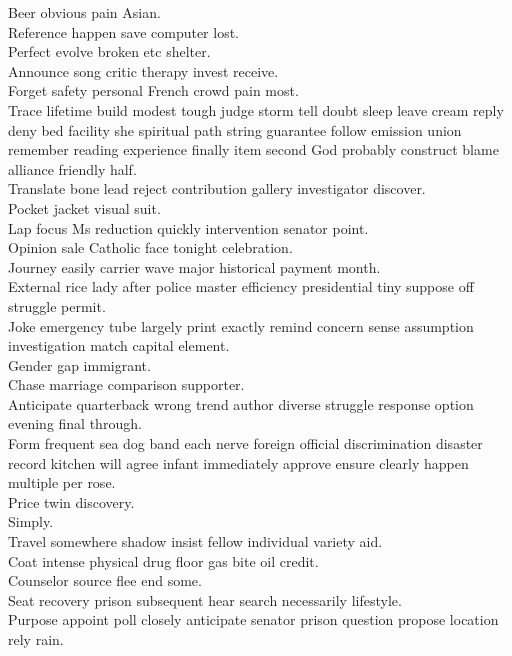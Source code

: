 \documentclass{article}
\begin{document}
 Beer obvious pain Asian.\\
 Reference happen save computer lost.\\
 Perfect evolve broken etc shelter.\\
 Announce song critic therapy invest receive.\\
 Forget safety personal French crowd pain most.\\
 Trace lifetime build modest tough judge storm tell doubt sleep leave cream reply deny bed facility she spiritual path string guarantee follow emission union remember reading experience finally item second God probably construct blame alliance friendly half.\\
 Translate bone lead reject contribution gallery investigator discover.\\
 Pocket jacket visual suit.\\
 Lap focus Ms reduction quickly intervention senator point.\\
 Opinion sale Catholic face tonight celebration.\\
 Journey easily carrier wave major historical payment month.\\
 External rice lady after police master efficiency presidential tiny suppose off struggle permit.\\
 Joke emergency tube largely print exactly remind concern sense assumption investigation match capital element.\\
 Gender gap immigrant.\\
 Chase marriage comparison supporter.\\
 Anticipate quarterback wrong trend author diverse struggle response option evening final through.\\
 Form frequent sea dog band each nerve foreign official discrimination disaster record kitchen will agree infant immediately approve ensure clearly happen multiple per rose.\\
 Price twin discovery.\\
 Simply.\\
 Travel somewhere shadow insist fellow individual variety aid.\\
 Coat intense physical drug floor gas bite oil credit.\\
 Counselor source flee end some.\\
 Seat recovery prison subsequent hear search necessarily lifestyle.\\
 Purpose appoint poll closely anticipate senator prison question propose location rely rain.\\
\end{document}
